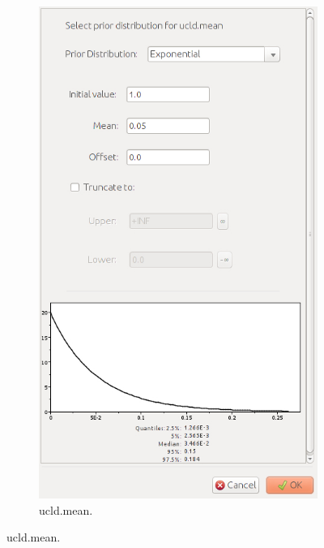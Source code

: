 {    \begin{figure}[htbp]
        \centering
        \begin{subfigure}[b]{0.3\textwidth}
            \includegraphics[width=\textwidth]{../screenshots/beauti-prior-ucldmean-no-geo.jpg}
            \caption{ucld.mean.}
            \label{fig:beautiPriorsUcldMean}
        \end{subfigure}

\end{figure}}
